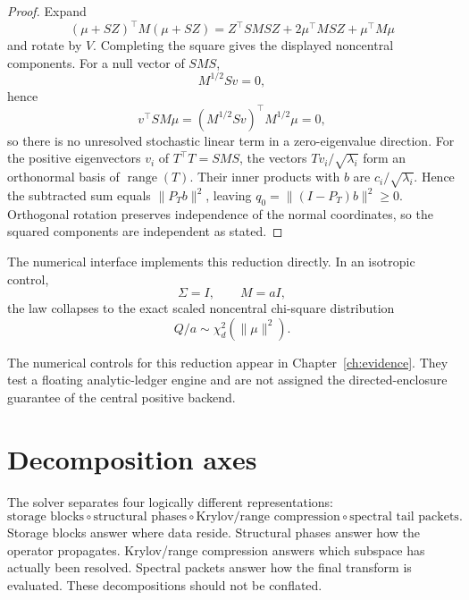 \begin{proof}
Expand
\[
(\mu+SZ)^\top M(\mu+SZ)
=
Z^\top SMSZ
+
2\mu^\top MSZ
+
\mu^\top M\mu
\]
and rotate by \(V\).  Completing the square gives the displayed
noncentral components.  For a null vector of \(SMS\),
\[
M^{1/2}Sv=0,
\]
hence
\[
v^\top SM\mu
=
(M^{1/2}Sv)^\top M^{1/2}\mu
=
0,
\]
so there is no unresolved stochastic linear term in a zero-eigenvalue
direction. For the positive eigenvectors $v_i$ of $T^\top T=SMS$,
the vectors $Tv_i/\sqrt{\lambda_i}$ form an orthonormal basis of
$\operatorname{range}(T)$. Their inner products with $b$ are
$c_i/\sqrt{\lambda_i}$. Hence the subtracted sum equals $\|P_Tb\|^2$,
leaving $q_0=\|(I-P_T)b\|^2\ge0$. Orthogonal rotation preserves
independence of the normal coordinates, so the squared components are
independent as stated.
\end{proof}

The numerical interface implements this reduction directly.  In an isotropic
control,
\[
\Sigma=I,\qquad M=aI,
\]
the law collapses to the exact scaled noncentral chi-square distribution
\[
Q/a\sim\chi^2_d(\|\mu\|^2).
\]

The numerical controls for this reduction appear in
Chapter~\ref{ch:evidence}. They test a floating analytic-ledger engine and
are not assigned the directed-enclosure guarantee of the central positive
backend.

\section{Decomposition axes}

The solver separates four logically different representations:
\[
\boxed{
\text{storage blocks}
\circ
\text{structural phases}
\circ
\text{Krylov/range compression}
\circ
\text{spectral tail packets}.
}
\]
Storage blocks answer where data reside.  Structural phases answer how the
operator propagates.  Krylov/range compression answers which subspace has
actually been resolved.  Spectral packets answer how the final transform is
evaluated.  These decompositions should not be conflated.




